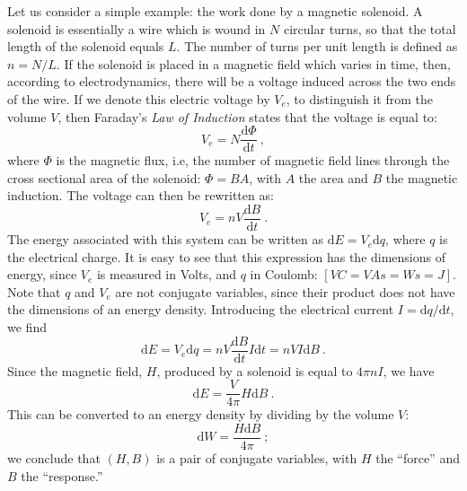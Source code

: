 \begin{example}
Let us consider a simple example: the work done by a magnetic solenoid.  A solenoid is essentially a wire which is wound in $N$ circular turns, so that the total length of the solenoid equals $L$.   The number of turns per unit length is defined as $n=N/L$.  If the solenoid is placed in a magnetic field which varies in time, then, according to electrodynamics, there will be a voltage induced across the two ends of the wire.  If we denote this electric voltage by $V_e$, to distinguish it from the volume $V$, then Faraday's \textit{Law of Induction} states that the voltage is equal to:
\begin{equation}
	V_e = N\frac{\mathrm{d}\Phi}{\mathrm{d}t}\ ,
\end{equation}
where $\Phi$ is the magnetic flux, i.e, the number of magnetic field lines through the cross sectional area of the solenoid: $\Phi = BA$, with $A$ the area and $B$ the magnetic induction.  The voltage can then be rewritten as:
\begin{equation}
	V_e = n V \frac{\mathrm{d}B}{\mathrm{d}t}\ .
\end{equation}
The energy associated with this system can be written as $\mathrm{d}E=V_e\mathrm{d}q$, where $q$ is the electrical charge. It is easy to see that this expression has the dimensions of energy, since $V_e$ is measured in Volts, and $q$ in  Coulomb: $[VC = VAs = Ws = J]$.  Note that $q$ and $V_e$ are not conjugate variables, since their product does not have the dimensions of an energy density.  Introducing the electrical current $I=\mathrm{d}q/\mathrm{d}t$, we find
\begin{equation}
	\mathrm{d}E = V_e\mathrm{d}q = nV\frac{\mathrm{d}B}{\mathrm{d}t} I\mathrm{d}t = nVI\mathrm{d}B\ .
\end{equation}
Since the magnetic field, $H$, produced by a solenoid is equal to $4\pi nI$, we have
\begin{equation}
	\mathrm{d}E = \frac{V}{4\pi} H\mathrm{d}B\ .
\end{equation}
This can be converted to an energy density by dividing by the volume $V$:
\begin{equation}
	\mathrm{d}W = \frac{H\mathrm{d}B}{4\pi}\ ;
\end{equation}
we conclude that $(H,B)$ is a pair of conjugate variables, with $H$ the ``force'' and $B$ the ``response.''
\end{example}

